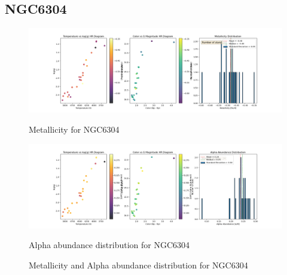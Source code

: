 \documentclass[a4paper,12pt]{article}
\begin{document}
\subsection{NGC6304}
\begin{figure}[H]
    \centering
    \begin{minipage}[b]{0.8\textwidth}
        \centering
        \includegraphics[width=\textwidth]{NGC6304_metalicity.png}
        \caption{Metallicity for NGC6304}
        \label{fig:NGC6304_metalicity}
    \end{minipage}
    \hfill
    \begin{minipage}[b]{0.8\textwidth}
        \centering
        \includegraphics[width=\textwidth]{NGC6304_alpha.png}
        \caption{Alpha abundance distribution for NGC6304}
        \label{fig:NGC6304_alpha}
    \end{minipage}
    \caption{Metallicity and Alpha abundance distribution for NGC6304}
    \label{fig:NGC6304_combined}
\end{figure}
\clearpage
\end{document}
